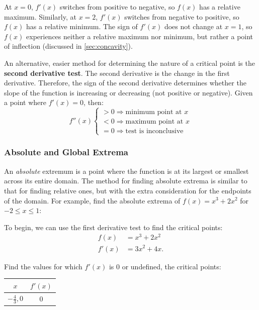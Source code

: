 \documentclass[12pt]{article}
\begin{document}
\noindent At $x = 0$, $f'(x)$ switches from positive to negative, so $f(x)$ has a relative maximum. Similarly, at $x = 2$, $f'(x)$ switches from negative to positive, so $f(x)$ has a relative minimum. The sign of $f'(x)$ does not change at $x = 1$, so $f(x)$ experiences neither a relative maximum nor minimum, but rather a point of inflection (discussed in \ref{sec:concavity}).

An alternative, easier method for determining the nature of a critical point is the \textbf{second derivative test}. The second derivative is the change in the first derivative. Therefore, the sign of the second derivative determines whether the slope of the function is increasing or decreasing (not positive or negative). Given a point where $f'(x) = 0$, then:
\[ f''(x) \begin{cases}
	> 0 \Rightarrow \text{minimum point at } x \\
	< 0 \Rightarrow \text{maximum point at } x \\
	= 0 \Rightarrow \text{test is inconclusive}
\end{cases} \]

\subsubsection{Absolute and Global Extrema}
An \textit{absolute} extremum is a point where the function is at its largest or smallest across its entire domain. The method for finding absolute extrema is similar to that for finding relative ones, but with the extra consideration for the endpoints of the domain. For example, find the absolute extrema of $f(x) = x^3 + 2x^2$ for $-2 \leq x \leq 1$:

\noindent To begin, we can use the first derivative test to find the critical points:
\begin{align*}
	f(x) &= x^3 + 2x^2 \\
	f'(x) &= 3x^2 + 4x.
\end{align*}

\noindent Find the values for which $f'(x)$ is $0$ or undefined, the critical points:
\begin{table}[H]
	\centering
	\begin{tabular}{|c|c|}
		\hline
		$x$ & $f'(x)$ \\
		\hline \hline
		$-\frac{4}{3}, 0$ & $0$ \\
		\hline
	\end{tabular}
\end{table}
\end{document}

